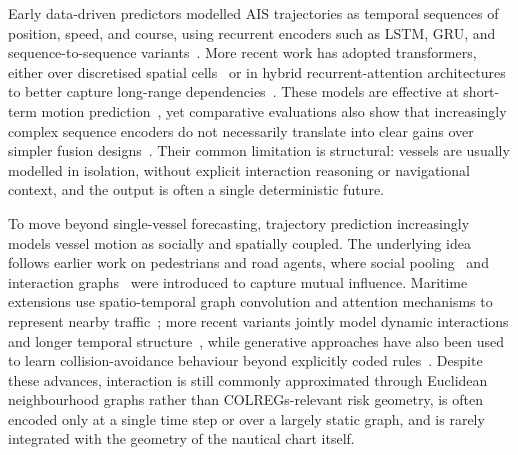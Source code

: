 \documentclass[runningheads]{preamp/llncs}
\begin{document}
Early data-driven predictors modelled \ac{AIS} trajectories as temporal sequences of position,
speed, and course, using recurrent encoders
such as \ac{LSTM}, \ac{GRU}, and sequence-to-sequence variants~\cite{murray2021ais,capobianco2021deep,er2025navigating}.
%
More recent work has adopted transformers,
either over discretised spatial cells~\cite{nguyen2024transformer}
or
in hybrid recurrent-attention architectures
to better capture long-range dependencies~\cite{jiang2023trfm,xue2024g}.
%
These models are effective at short-term motion prediction~\cite{li2023aisreview},
yet comparative evaluations also show
that increasingly complex sequence encoders do not necessarily translate into clear gains
over simpler fusion designs~\cite{slaughter2025vessel}.
Their common limitation is structural:
vessels are usually modelled in isolation,
without explicit interaction reasoning or navigational context,
and
the output is often a single deterministic future.

To move beyond single-vessel forecasting,
trajectory prediction increasingly models vessel motion
as socially and spatially coupled.
%
The underlying idea follows earlier work on pedestrians and road agents,
where social pooling~\cite{alahi2016social,lee2017desire}
and interaction graphs~\cite{li2019grip} were introduced to capture mutual influence.
%
Maritime extensions use spatio-temporal graph convolution and attention mechanisms
to represent nearby traffic~\cite{feng2022stgcnn,wang2024vessel,huang2024vessel};
more recent variants
jointly model dynamic interactions and longer temporal structure~\cite{zhang2024learning},
while
generative approaches have also been used to learn collision-avoidance behaviour
beyond explicitly coded rules~\cite{jia2023ragan}.
Despite these advances,
interaction is still commonly approximated through Euclidean neighbourhood graphs
rather than \ac{COLREGs}-relevant risk geometry,
is often encoded only at a single time step or over a largely static graph,
and
is rarely integrated with the geometry of the nautical chart itself.
\end{document}
